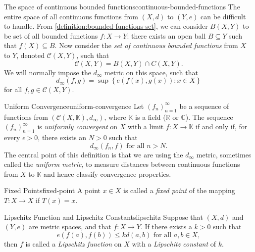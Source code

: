 \documentclass{article}
\numberwithin{equation}{section}
\numberwithin{figure}{section}
\begin{document}
\begin{definition}{The space of continuous bounded
        functions}{continuous-bounded-functions}
    The entire space of all continuous functions from $ (X, d) $ to $ (Y, e) $
    can be difficult to handle. From \cref{definition:bounded-functions-set}, we
    can consider $ B(X, Y) $ to be set of all bounded functions $ f \colon X \to
    Y $: there exists an open ball $ B \subseteq Y $ such that $ f(X) \subseteq
    B $. Now consider the \emph{set of continuous bounded functions} from $ X $
    to $ Y $, denoted $ \mathcal{C}(X, Y) $, such that
    \begin{equation}
        \mathcal{C}(X, Y) = B(X, Y) \cap C(X, Y).
    \end{equation}
    We will normally impose the $ d_\infty $ metric on this space, such that
    \begin{equation}
        d_\infty(f, g) = \sup\left\{ e\left(f(x), g(x)\right) \colon x \in X
        \right\}
    \end{equation}
    for all $ f, g \in \mathcal{C}(X, Y) $.
\end{definition}
\begin{definition}{Uniform Convergence}{uniform-convergence}
    Let $ \left( f_n \right)_{n=1}^\infty $ be a sequence of functions from
    $ \left(\mathcal{C}(X, \mathbb{K}), d_\infty\right) $, where $ \mathbb{K} $
    is a field ($ \mathbb{R} $ or $ \mathbb{C} $). The sequence $ \left( f_n
    \right)_{n=1}^\infty $ is \emph{uniformly convergent} on $ X $ with a limit
    $ f \colon X \to \mathbb{K} $ if and only if, for every $ \epsilon > 0 $,
    there exists an $ N > 0 $ such that
    \begin{equation}
        d_\infty\left( f_n, f \right) \text{ for all } n > N.
    \end{equation}
    The central point of this definition is that we are using the $ d_\infty $
    metric, sometimes called the \emph{uniform metric}, to measure distances
    between continuous functions from $ X $ to $ \mathbb{K} $ and hence classify
    convergence properties.
\end{definition}
\begin{definition}{Fixed Points}{fixed-point}
    A point $ x \in X $ is called a \emph{fixed point} of the mapping $ T \colon
    X \to X $ if $ T(x) = x $.
\end{definition}
\begin{definition}{Lipschitz Function and Lipschitz Constants}{lipschitz}
    Suppose that $ (X, d) $ and $ (Y, e) $ are metric spaces, and that $ f
    \colon X \to Y $. If there exists a $ k > 0 $ such that
    \begin{equation}
        e\left( f(a), f(b) \right) \leq kd(a, b) \text{ for all } a, b \in X,
    \end{equation}
    then $ f $ is called a \emph{Lipschitz function} on $ X $ with a
    \emph{Lipschitz constant} of $ k $.
\end{definition}
\end{document}
